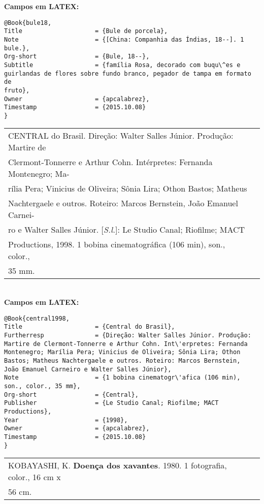 \textbf{Campos em LATEX:} 

\begin{verbatim}
@Book{bule18,
Title                    = {Bule de porcela},
Note                     = {[China: Companhia das Índias, 18--]. 1 
bule.}, 
Org-short                = {Bule, 18--},
Subtitle                 = {família Rosa, decorado com buqu\^es e 
guirlandas de flores sobre fundo branco, pegador de tampa em formato de 
fruto},
Owner                    = {apcalabrez},
Timestamp                = {2015.10.08}
}
\end{verbatim}

\begin{tabular}{|l|c|} \hline
	CENTRAL do Brasil. Direção: Walter Salles Júnior. Produção: Martire de\\
	Clermont-Tonnerre e Arthur Cohn. Int\'erpretes: Fernanda Montenegro; Ma-\\
	rília Pera; Vinicius de Oliveira; Sônia Lira; Othon Bastos; Matheus\\ 
	Nachtergaele e outros. Roteiro: Marcos Bernstein, João Emanuel Carnei-\\
	ro e Walter Salles Júnior. [\textit{S.l.}]: Le Studio Canal; Riofilme; MACT \\
	Productions, 1998. 1 bobina cinematogr\'afica (106 min), son., color., 
	\\35 mm. 
	\\\hline
\end{tabular} \\

\textbf{Campos em LATEX:} 

\begin{verbatim}
@Book{central1998,
Title                    = {Central do Brasil},
Furtherresp              = {Direção: Walter Salles Júnior. Produção: 
Martire de Clermont-Tonnerre e Arthur Cohn. Int\'erpretes: Fernanda 
Montenegro; Marília Pera; Vinicius de Oliveira; Sônia Lira; Othon 
Bastos; Matheus Nachtergaele e outros. Roteiro: Marcos Bernstein, 
João Emanuel Carneiro e Walter Salles Júnior},
Note                     = {1 bobina cinematogr\'afica (106 min), 
son., color., 35 mm},
Org-short                = {Central},
Publisher                = {Le Studio Canal; Riofilme; MACT 
Productions},
Year                     = {1998},
Owner                    = {apcalabrez},
Timestamp                = {2015.10.08}
}
\end{verbatim}

\begin{tabular}{|l|c|} \hline
	KOBAYASHI, K. \textbf{Doença dos xavantes}. 1980. 1 fotografia, color., 16 cm x \\
	56 cm. 
	\\\hline
\end{tabular} \\

